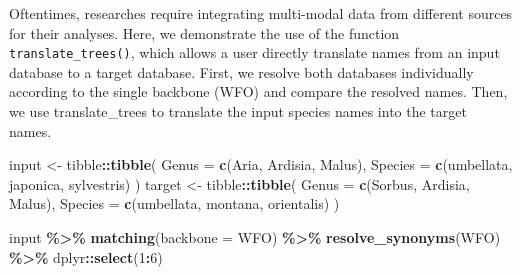 \documentclass[
  11pt,
]{article}
\newenvironment{Shaded}{\begin{snugshade}}{\end{snugshade}}
\newcommand{\AttributeTok}[1]{\textcolor[rgb]{0.13,0.29,0.53}{#1}}
\newcommand{\DecValTok}[1]{\textcolor[rgb]{0.00,0.00,0.81}{#1}}
\newcommand{\FunctionTok}[1]{\textcolor[rgb]{0.13,0.29,0.53}{\textbf{#1}}}
\newcommand{\NormalTok}[1]{#1}
\newcommand{\OtherTok}[1]{\textcolor[rgb]{0.56,0.35,0.01}{#1}}
\newcommand{\SpecialCharTok}[1]{\textcolor[rgb]{0.81,0.36,0.00}{\textbf{#1}}}
\newcommand{\StringTok}[1]{\textcolor[rgb]{0.31,0.60,0.02}{#1}}
\begin{document}
Oftentimes, researches require integrating multi-modal data from
different sources for their analyses. Here, we demonstrate the use of
the function \verb|translate_trees()|, which allows a user directly
translate names from an input database to a target database. First, we
resolve both databases individually according to the single backbone
(WFO) and compare the resolved names. Then, we use translate\_trees to
translate the input species names into the target names.

\begin{Shaded}
\begin{Highlighting}[]
\NormalTok{input }\OtherTok{\textless{}{-}}\NormalTok{ tibble}\SpecialCharTok{::}\FunctionTok{tibble}\NormalTok{(}
  \AttributeTok{Genus =} \FunctionTok{c}\NormalTok{(}\StringTok{\textquotesingle{}Aria\textquotesingle{}}\NormalTok{, }\StringTok{\textquotesingle{}Ardisia\textquotesingle{}}\NormalTok{, }\StringTok{\textquotesingle{}Malus\textquotesingle{}}\NormalTok{),}
  \AttributeTok{Species =} \FunctionTok{c}\NormalTok{(}\StringTok{\textquotesingle{}umbellata\textquotesingle{}}\NormalTok{, }\StringTok{\textquotesingle{}japonica\textquotesingle{}}\NormalTok{, }\StringTok{\textquotesingle{}sylvestris\textquotesingle{}}\NormalTok{)}
\NormalTok{)}
\NormalTok{target }\OtherTok{\textless{}{-}}\NormalTok{ tibble}\SpecialCharTok{::}\FunctionTok{tibble}\NormalTok{(}
  \AttributeTok{Genus =} \FunctionTok{c}\NormalTok{(}\StringTok{\textquotesingle{}Sorbus\textquotesingle{}}\NormalTok{, }\StringTok{\textquotesingle{}Ardisia\textquotesingle{}}\NormalTok{, }\StringTok{\textquotesingle{}Malus\textquotesingle{}}\NormalTok{),}
  \AttributeTok{Species =} \FunctionTok{c}\NormalTok{(}\StringTok{\textquotesingle{}umbellata\textquotesingle{}}\NormalTok{, }\StringTok{\textquotesingle{}montana\textquotesingle{}}\NormalTok{, }\StringTok{\textquotesingle{}orientalis\textquotesingle{}}\NormalTok{)}
\NormalTok{)}
\end{Highlighting}
\end{Shaded}

\small

\begin{Shaded}
\begin{Highlighting}[]
\NormalTok{input }\SpecialCharTok{\%\textgreater{}\%}
  \FunctionTok{matching}\NormalTok{(}\AttributeTok{backbone =} \StringTok{\textquotesingle{}WFO\textquotesingle{}}\NormalTok{) }\SpecialCharTok{\%\textgreater{}\%}
  \FunctionTok{resolve\_synonyms}\NormalTok{(}\StringTok{\textquotesingle{}WFO\textquotesingle{}}\NormalTok{) }\SpecialCharTok{\%\textgreater{}\%}
\NormalTok{  dplyr}\SpecialCharTok{::}\FunctionTok{select}\NormalTok{(}\DecValTok{1}\SpecialCharTok{:}\DecValTok{6}\NormalTok{)}
\end{Highlighting}
\end{Shaded}
\end{document}
